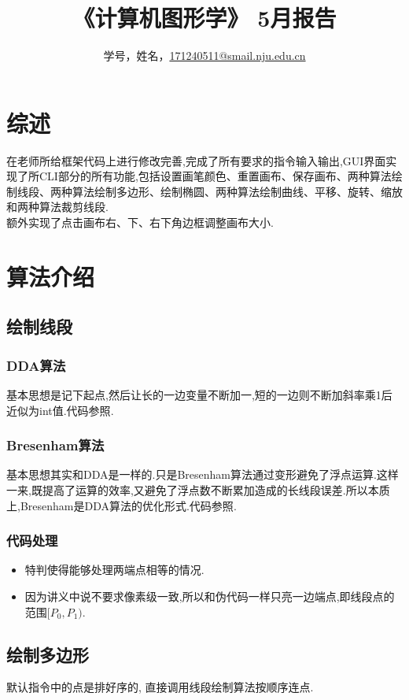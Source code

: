 \documentclass[a4paper,UTF8]{article}
\theoremstyle{definition}
\begin{document}
\title{\textbf{《计算机图形学》 5月报告 }}
\author{学号，姓名，\href{mailto:xxx@xxx.com}{171240511@smail.nju.edu.cn}}
\maketitle

\section{综述}
在老师所给框架代码上进行修改完善,完成了所有要求的指令输入输出,GUI界面实现了所CLI部分的所有功能,包括设置画笔颜色、重置画布、保存画布、两种算法绘制线段、两种算法绘制多边形、绘制椭圆、两种算法绘制曲线、平移、旋转、缩放和两种算法裁剪线段.\\
\indent 额外实现了点击画布右、下、右下角边框调整画布大小.
\section{算法介绍}
\subsection{绘制线段}
\subsubsection{DDA算法} 
基本思想是记下起点,然后让长的一边变量不断加一,短的一边则不断加斜率乘1后近似为int值.代码参照\cite{rog_2002}.
\subsubsection{Bresenham算法} 
基本思想其实和DDA是一样的.只是Bresenham算法通过变形避免了浮点运算.这样一来,既提高了运算的效率,又避免了浮点数不断累加造成的长线段误差.所以本质上,Bresenham是DDA算法的优化形式.代码参照\cite{rog_2002}.
\subsubsection{代码处理}
\begin{itemize}
\item 特判使得能够处理两端点相等的情况.
\item 因为讲义中说不要求像素级一致,所以和伪代码一样只亮一边端点,即线段点的范围$[P_0,P_1)$.
\end{itemize}

\subsection{绘制多边形}
默认指令中的点是排好序的, 直接调用线段绘制算法按顺序连点.
\end{document}
